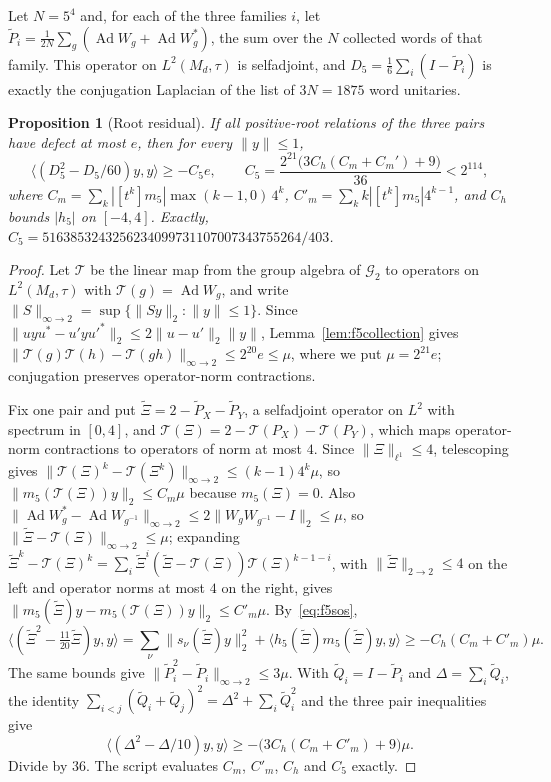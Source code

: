 \documentclass[11pt]{article}
\newtheorem{proposition}[theorem]{Proposition}
\newcommand{\Ad}{\operatorname{Ad}}
\begin{document}
Let $N=5^4$ and, for each of the three families $i$, let $\widetilde P_i=\frac1{2N}\sum_{g}(\Ad W_g+\Ad W_g^*)$, the sum over the $N$ collected words of that family.  This operator on $L^2(M_d,\tau)$ is selfadjoint, and $D_5=\frac16\sum_i(I-\widetilde P_i)$ is exactly the conjugation Laplacian of the list of $3N=1875$ word unitaries.

\begin{proposition}[Root residual]\label{prop:f5rootres}
If all positive-root relations of the three pairs have defect at most $e$, then for every $\|y\|\le1$,
\begin{equation}\label{eq:f5rootres}
 \langle(D_5^2-D_5/60)y,y\rangle\ge-C_5e,\qquad C_5=\frac{2^{21}\bigl(3C_h(C_m+C_m')+9\bigr)}{36}<2^{114},
\end{equation}
where $C_m=\sum_k|[t^k]m_5|\max(k-1,0)\,4^k$, $C'_m=\sum_kk|[t^k]m_5|4^{k-1}$, and $C_h$ bounds $|h_5|$ on $[-4,4]$.  Exactly, $C_5=5163853243256234099731107007343755264/403$.
\end{proposition}
\begin{proof}
Let $\mathcal T$ be the linear map from the group algebra of $\mathcal G_2$ to operators on $L^2(M_d,\tau)$ with $\mathcal T(g)=\Ad W_g$, and write $\|S\|_{\infty\to2}=\sup\{\|Sy\|_2:\|y\|\le1\}$.  Since $\|uyu^*-u'yu'^*\|_2\le2\|u-u'\|_2\|y\|$, Lemma~\ref{lem:f5collection} gives $\|\mathcal T(g)\mathcal T(h)-\mathcal T(gh)\|_{\infty\to2}\le2^{20}e\le\mu$, where we put $\mu=2^{21}e$; conjugation preserves operator-norm contractions.

Fix one pair and put $\widetilde\Xi=2-\widetilde P_X-\widetilde P_Y$, a selfadjoint operator on $L^2$ with spectrum in $[0,4]$, and $\mathcal T(\Xi)=2-\mathcal T(P_X)-\mathcal T(P_Y)$, which maps operator-norm contractions to operators of norm at most $4$.  Since $\|\Xi\|_{\ell^1}\le4$, telescoping gives $\|\mathcal T(\Xi)^k-\mathcal T(\Xi^k)\|_{\infty\to2}\le(k-1)4^k\mu$, so $\|m_5(\mathcal T(\Xi))y\|_2\le C_m\mu$ because $m_5(\Xi)=0$.  Also $\|\Ad W_g^*-\Ad W_{g^{-1}}\|_{\infty\to2}\le2\|W_gW_{g^{-1}}-I\|_2\le\mu$, so $\|\widetilde\Xi-\mathcal T(\Xi)\|_{\infty\to2}\le\mu$; expanding $\widetilde\Xi^k-\mathcal T(\Xi)^k=\sum_i\widetilde\Xi^i(\widetilde\Xi-\mathcal T(\Xi))\mathcal T(\Xi)^{k-1-i}$, with $\|\widetilde\Xi\|_{2\to2}\le4$ on the left and operator norms at most $4$ on the right, gives $\|m_5(\widetilde\Xi)y-m_5(\mathcal T(\Xi))y\|_2\le C'_m\mu$.  By~\eqref{eq:f5sos},
\[
 \langle(\widetilde\Xi^2-\tfrac{11}{20}\widetilde\Xi)y,y\rangle=\sum_\nu\|s_\nu(\widetilde\Xi)y\|_2^2+\langle h_5(\widetilde\Xi)m_5(\widetilde\Xi)y,y\rangle\ge-C_h(C_m+C'_m)\mu.
\]
The same bounds give $\|\widetilde P_i^2-\widetilde P_i\|_{\infty\to2}\le3\mu$.  With $\widetilde Q_i=I-\widetilde P_i$ and $\Delta=\sum_i\widetilde Q_i$, the identity $\sum_{i<j}(\widetilde Q_i+\widetilde Q_j)^2=\Delta^2+\sum_i\widetilde Q_i^2$ and the three pair inequalities give
\[
 \langle(\Delta^2-\Delta/10)y,y\rangle\ge-\bigl(3C_h(C_m+C'_m)+9\bigr)\mu.
\]
Divide by $36$.  The script  evaluates $C_m$, $C'_m$, $C_h$ and $C_5$ exactly.
\end{proof}
\end{document}
